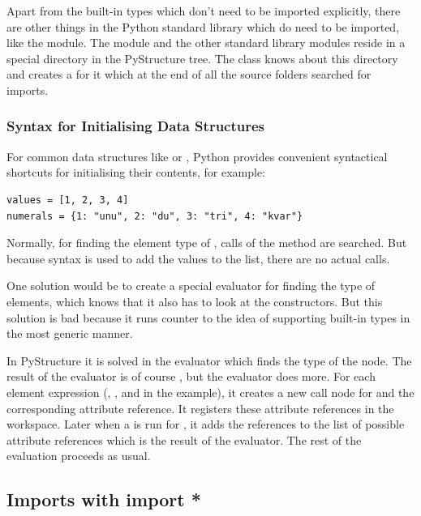 \documentclass[12pt,halfparskip]{scrreprt}
\begin{document}
Apart from the built-in types which don't need to be imported explicitly, there are other things in the Python standard library which do need to be imported, like the  module. The  module and the other standard library modules reside in a special directory in the PyStructure tree. The  class knows about this directory and creates a  for it which at the end of all the source folders searched for imports.

\subsubsection{Syntax for Initialising Data Structures}

For common data structures like  or , Python provides convenient syntactical shortcuts for initialising their contents, for example:

\begin{lstlisting}
values = [1, 2, 3, 4]
numerals = {1: "unu", 2: "du", 3: "tri", 4: "kvar"}
\end{lstlisting}

Normally, for finding the element type of , calls of the method  are searched. But because syntax is used to add the values to the list, there are no actual  calls.

One solution would be to create a special evaluator for finding the type of  elements, which knows that it also has to look at the constructors. But this solution is bad because it runs counter to the idea of supporting built-in types in the most generic manner.

In PyStructure it is solved in the evaluator which finds the type of the  node. The result of the evaluator is of course , but the evaluator does more. For each element expression (, ,  and  in the example), it creates a new call node for  and the corresponding attribute reference. It registers these attribute references in the workspace. Later when a  is run for , it adds the references to the list of possible attribute references which is the result of the evaluator. The rest of the evaluation proceeds as usual.


\subsection{Imports with import *}\label{import_star}
\end{document}
